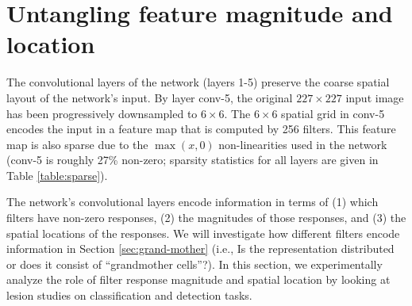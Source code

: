 \section{Untangling feature magnitude and location}
\label{sec-where-info}
The convolutional layers of the network (layers 1-5) preserve the coarse spatial layout of the network's input.
By layer conv-5, the original $227 \times 227$ input image has been progressively downsampled to $6 \times 6$.
The $6 \times 6$ spatial grid in conv-5 encodes the input in a feature map that is computed by 256 filters.
This feature map is also sparse due to the $\max(x, 0)$ non-linearities used in the network (conv-5 is roughly 27\% non-zero; sparsity statistics for all layers are given in Table \ref{table:sparse}).

The network's convolutional layers encode information in terms of (1) which filters have non-zero responses, (2) the magnitudes of those responses, and (3) the spatial locations of the responses.
We will investigate how different filters encode information in Section \ref{sec:grand-mother} (i.e., Is the representation distributed or does it consist of ``grandmother cells''?).
In this section, we experimentally analyze the role of filter response magnitude and spatial location by looking at lesion studies on classification and detection tasks.

